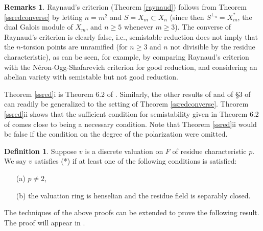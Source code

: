 \documentclass{amsart}
\theoremstyle{definition}
\newtheorem{defn}[thm]{Definition}
\newtheorem{rems}[thm]{Remarks}
\begin{document}
\begin{rems}
Raynaud's criterion (Theorem \ref{raynaud}) follows from 
Theorem \ref{ssredconverse} by letting 
$n = m^2$ and $S = X_m \subset X_{n}$
(since then $S^{\perp_n} = X^\ast_m$, the dual Galois module
of $X_m$, and $n \ge 5$ whenever $m \ge 3$). 
The converse of Raynaud's criterion is clearly false, 
i.e., semistable reduction does not imply that
the $n$-torsion points are unramified (for $n \ge 3$ and $n$ not
divisible by the residue characteristic), as can be seen, for
example, by
comparing Raynaud's criterion with the N\'eron-Ogg-Shafarevich
criterion for good reduction, and considering an abelian variety
with semistable but not good reduction.

Theorem \ref{ssred}i is Theorem 6.2 of \cite{semistab}.
Similarly, the other results of \cite{semistab} and of \S 3 of
\cite{connected} can readily be generalized to the setting 
of Theorem \ref{ssredconverse}.
Theorem \ref{ssred}ii shows that the sufficient condition for
semistability given in Theorem 6.2 of \cite{semistab} comes close
to being a necessary condition. 
Note that Theorem \ref{ssred}ii would be false if the condition on 
the degree of the polarization were omitted.
\end{rems}

\begin{defn}
Suppose $v$ is a discrete valuation on $F$ of residue characteristic
$p$. 
We say $v$ satisfies (*) if at least one of the following
conditions is satisfied:
\begin{enumerate}
\item[(a)]  $p \ne 2$, 
\item[(b)] the valuation ring 
is henselian and the residue field is separably closed.
\end{enumerate}
\end{defn}

The techniques of the above proofs can be extended to prove
the following result. The proof will appear in \cite{etale}.
\end{document}
